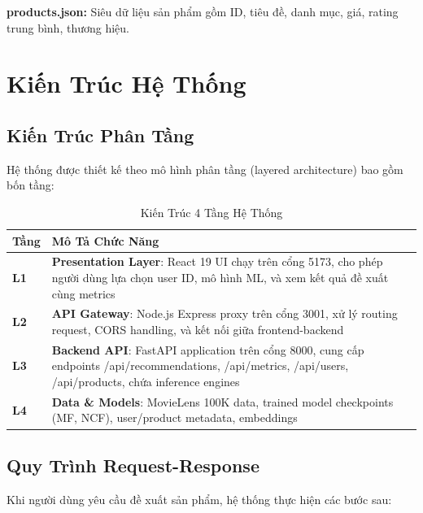 \documentclass[12pt,a4paper]{article}
\begin{document}
\textbf{products.json:} Siêu dữ liệu sản phẩm gồm ID, tiêu đề, danh mục, giá, rating trung bình, thương hiệu.

\section{Kiến Trúc Hệ Thống}

\subsection{Kiến Trúc Phân Tầng}

Hệ thống được thiết kế theo mô hình phân tầng (layered architecture) bao gồm bốn tầng:

\begin{table}[H]
\centering
\begin{tabular}{|p{1.5cm}|p{13cm}|}
\hline
\textbf{Tầng} & \textbf{Mô Tả Chức Năng} \\
\hline
\textbf{L1} & \textbf{Presentation Layer}: React 19 UI chạy trên cổng 5173, cho phép người dùng lựa chọn user ID, mô hình ML, và xem kết quả đề xuất cùng metrics \\
\hline
\textbf{L2} & \textbf{API Gateway}: Node.js Express proxy trên cổng 3001, xử lý routing request, CORS handling, và kết nối giữa frontend-backend \\
\hline
\textbf{L3} & \textbf{Backend API}: FastAPI application trên cổng 8000, cung cấp endpoints /api/recommendations, /api/metrics, /api/users, /api/products, chứa inference engines \\
\hline
\textbf{L4} & \textbf{Data \& Models}: MovieLens 100K data, trained model checkpoints (MF, NCF), user/product metadata, embeddings \\
\hline
\end{tabular}
\caption{Kiến Trúc 4 Tầng Hệ Thống}
\end{table}

\subsection{Quy Trình Request-Response}

Khi người dùng yêu cầu đề xuất sản phẩm, hệ thống thực hiện các bước sau:
\end{document}
